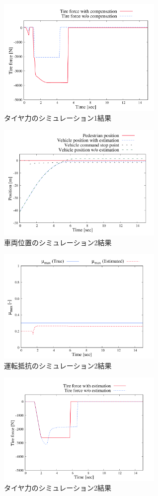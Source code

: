 \begin{figure}[H]
    \centering
    \includegraphics[width=8cm]{./fig/fig10.png}
    \caption{タイヤ力のシミュレーション1結果}
\end{figure}
\newpage
\begin{figure}[H]
    \centering
    \includegraphics[width=8cm]{./fig/fig11.png}
    \caption{車両位置のシミュレーション2結果}
\end{figure}

\begin{figure}[H]
    \centering
    \includegraphics[width=8cm]{./fig/fig12.png}
    \caption{運転抵抗のシミュレーション2結果}
\end{figure}

\begin{figure}[H]
    \centering
    \includegraphics[width=8cm]{./fig/fig13.png}
    \caption{タイヤ力のシミュレーション2結果}
\end{figure}

